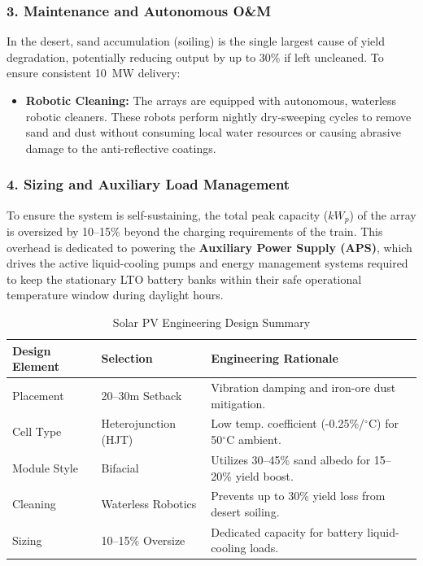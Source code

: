 \subsubsection*{3. Maintenance and Autonomous O\&M}
In the desert, sand accumulation (soiling) is the single largest cause of yield degradation, potentially reducing output by up to 30\% if left uncleaned. To ensure consistent 10~MW delivery:
\begin{itemize}
    \item \textbf{Robotic Cleaning:} The arrays are equipped with autonomous, waterless robotic cleaners. These robots perform nightly dry-sweeping cycles to remove sand and dust without consuming local water resources or causing abrasive damage to the anti-reflective coatings.
\end{itemize}

\subsubsection*{4. Sizing and Auxiliary Load Management}
To ensure the system is self-sustaining, the total peak capacity ($kW_p$) of the array is oversized by 10--15\% beyond the charging requirements of the train. This overhead is dedicated to powering the \textbf{Auxiliary Power Supply (APS)}, which drives the active liquid-cooling pumps and energy management systems required to keep the stationary LTO battery banks within their safe operational temperature window during daylight hours.

\begin{table}[h!]
\centering
\caption{Solar PV Engineering Design Summary}
\label{table:pv_design}
\begin{tabular}{|l|l|l|}
\hline
\textbf{Design Element} & \textbf{Selection} & \textbf{Engineering Rationale} \\ \hline
Placement & 20--30m Setback & Vibration damping and iron-ore dust mitigation. \\ \hline
Cell Type & Heterojunction (HJT) & Low temp. coefficient (-0.25\%/$^\circ$C) for 50$^\circ$C ambient. \\ \hline
Module Style & Bifacial & Utilizes 30--45\% sand albedo for 15--20\% yield boost. \\ \hline
Cleaning & Waterless Robotics & Prevents up to 30\% yield loss from desert soiling. \\ \hline
Sizing & 10--15\% Oversize & Dedicated capacity for battery liquid-cooling loads. \\ \hline
\end{tabular}
\end{table}